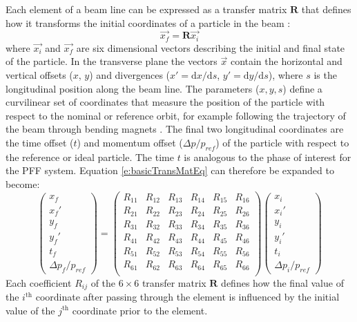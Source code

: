 Each element of a beam line can be expressed as a transfer matrix \(\mathbf{R}\) that defines how it transforms the initial coordinates of a particle in the beam \cite{wilson}:
\begin{equation}
\vec{x_f} = \mathbf{R}\vec{x_i}
\label{e:basicTransMatEq}
\end{equation}
where \(\vec{x_i}\) and \(\vec{x_f}\) are six dimensional vectors describing the initial and final state of the particle. In the transverse plane the vectors \(\vec{x}\) contain the horizontal and vertical offsets (\(x\), \(y\)) and divergences (\(x' = \mathrm{d}x/\mathrm{d}s\), \(y' = \mathrm{d}y/\mathrm{d}s\)), where \(s\) is the longitudinal position along the beam line. The parameters (\(x, y, s\)) define a curvilinear set of coordinates that measure the position of the particle with respect to the nominal or reference orbit, for example following the trajectory of the beam through bending magnets \cite{wilson}. The final two longitudinal coordinates are the time offset (\(t\)) and momentum offset (\(\Delta p/p_{ref}\)) of the particle with respect to the reference or ideal particle. The time \(t\) is analogous to the phase of interest for the PFF system. Equation \ref{e:basicTransMatEq} can therefore be expanded to become:
\begin{equation}
\left( \begin{array}{c} x_f \\ x_f' \\ y_f \\ y_f' \\ t_f \\ \Delta p_f/p_{ref} \end{array} \right)
=
\left( \begin{array}{cccccc} 
R_{11} & R_{12} & R_{13} & R_{14} & R_{15} & R_{16}\\ 
R_{21} & R_{22} & R_{23} & R_{24}  & R_{25} & R_{26}\\ 
R_{31} & R_{32} & R_{33} & R_{34}  & R_{35} & R_{36}\\
R_{41} & R_{42} & R_{43} & R_{44}  & R_{45} & R_{46}\\
R_{51} & R_{52} & R_{53} & R_{54}  & R_{55} & R_{56}\\
R_{61} & R_{62} & R_{63} & R_{64}  & R_{65} & R_{66}\\
\end{array} \right)
\left( \begin{array}{c} x_i \\ x_i' \\ y_i \\ y_i' \\ t_i \\ \Delta p_i/p_{ref} \end{array} \right)
\end{equation}
Each coefficient \(R_{ij}\) of the \(6\times6\) transfer matrix \(\mathbf{R}\) defines how the final value of the \(i^{\mathrm{th}}\) coordinate after passing through the element is influenced by the initial value of the \(j^{\mathrm{th}}\) coordinate prior to the element.

